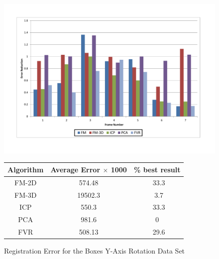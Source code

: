 \begin{figure}
\centering
\includegraphics[width=6in]{images/results/Boxes_Texture_Rotate}
\caption{Registration Error for the Boxes Y-Axis Rotation Data Set}
\label{fig:PET2}

\begin{tabular}{ccc}
\hline
\textbf{Algorithm} & \textbf{Average Error $\times$ 1000} & \textbf{\% best result}\\ \hline
FM-2D	& 574.48 & ~33.3\\
FM-3D	& 19502.3 & ~3.7\\
ICP		& 550.3 & ~33.3\\
PCA		& 981.6 & 0\\
FVR		& 508.13 & ~29.6\\
\end{tabular}
\label{tab:PET2ST}
\end{figure} 


